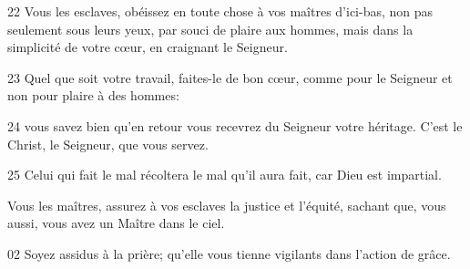 
22 Vous les esclaves, obéissez en toute chose à vos maîtres d’ici-bas, non pas seulement sous leurs yeux, par souci de plaire aux hommes, mais dans la simplicité de votre cœur, en craignant le Seigneur. 

23 Quel que soit votre travail, faites-le de bon cœur, comme pour le Seigneur et non pour plaire à des hommes:

24 vous savez bien qu’en retour vous recevrez du Seigneur votre héritage. C’est le Christ, le Seigneur, que vous servez.

25 Celui qui fait le mal récoltera le mal qu’il aura fait, car Dieu est impartial.

Vous les maîtres, assurez à vos esclaves la justice et l’équité, sachant que, vous aussi, vous avez un Maître dans le ciel.

02 Soyez assidus à la prière; qu’elle vous tienne vigilants dans l’action de grâce.